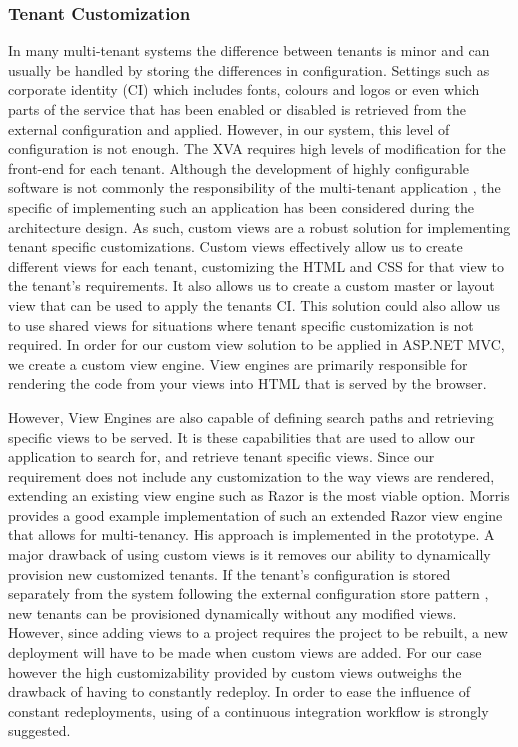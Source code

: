 \subsubsection{Tenant Customization}
\label{sec:viewengine}
In many multi-tenant systems the difference between tenants is minor and can usually be handled by storing the differences in configuration. Settings such as corporate identity (CI) which includes fonts, colours and logos or even which parts of the service that has been enabled or disabled is retrieved from the external configuration and applied. However, in our system, this level of configuration is not enough. The XVA requires high levels of modification for the front-end for each tenant. Although the development of highly configurable software is not commonly the responsibility of the multi-tenant application \cite{Krebs2012}, the specific of implementing such an application has been considered during the architecture design. As such, custom views are a robust solution for implementing tenant specific customizations. Custom views effectively allow us to create different views for each tenant, customizing the HTML and CSS for that view to the tenant's requirements. It also allows us to create a custom master or layout view that can be used to apply the tenants CI. This solution could also allow us to use shared views for situations where tenant specific customization is not required. In order for our custom view solution to be applied in ASP.NET MVC, we create a custom view engine. View engines are primarily responsible for rendering the code from your views into HTML that is served by the browser.

However, View Engines are also capable of defining search paths and retrieving specific views to be served. It is these capabilities that are used to allow our application to search for, and retrieve tenant specific views. Since our requirement does not include any customization to the way views are rendered, extending an existing view engine such as Razor is the most viable option. Morris \cite{Morris} provides a good example implementation of such an extended Razor view engine that allows for multi-tenancy. His approach is implemented in the prototype. A major drawback of using custom views is it removes our ability to dynamically provision new customized tenants. If the tenant's configuration is stored separately from the system following the external configuration store pattern \cite{Swanson}, new tenants can be provisioned dynamically without any modified views. However, since adding views to a project requires the project to be rebuilt, a new deployment will have to be made when custom views are added. For our case however the high customizability provided by custom views outweighs the drawback of having to constantly redeploy. In order to ease the influence of constant redeployments, using of a continuous integration workflow is strongly suggested.


